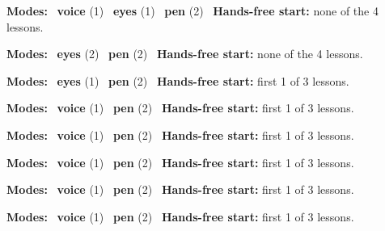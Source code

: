 \expandafter\def\csname hlchaptermodality6\endcsname{%
  {\small\noindent
    \textbf{Modes:} \hlvoicesign{}~\textbf{voice} (1) \quad \hlsightsign{}~\textbf{eyes} (1) \quad \hlpensign{}~\textbf{pen} (2)\quad
    \hlvoicesign{}~\textbf{Hands-free start:} none of the 4 lessons.%
    \par}\medskip
}

\expandafter\def\csname hlchaptermodality7\endcsname{%
  {\small\noindent
    \textbf{Modes:} \hlsightsign{}~\textbf{eyes} (2) \quad \hlpensign{}~\textbf{pen} (2)\quad
    \hlvoicesign{}~\textbf{Hands-free start:} none of the 4 lessons.%
    \par}\medskip
}

\expandafter\def\csname hlchaptermodality8\endcsname{%
  {\small\noindent
    \textbf{Modes:} \hlsightsign{}~\textbf{eyes} (1) \quad \hlpensign{}~\textbf{pen} (2)\quad
    \hlvoicesign{}~\textbf{Hands-free start:} first 1 of 3 lessons.%
    \par}\medskip
}

\expandafter\def\csname hlchaptermodality9\endcsname{%
  {\small\noindent
    \textbf{Modes:} \hlvoicesign{}~\textbf{voice} (1) \quad \hlpensign{}~\textbf{pen} (2)\quad
    \hlvoicesign{}~\textbf{Hands-free start:} first 1 of 3 lessons.%
    \par}\medskip
}

\expandafter\def\csname hlchaptermodality10\endcsname{%
  {\small\noindent
    \textbf{Modes:} \hlvoicesign{}~\textbf{voice} (1) \quad \hlpensign{}~\textbf{pen} (2)\quad
    \hlvoicesign{}~\textbf{Hands-free start:} first 1 of 3 lessons.%
    \par}\medskip
}

\expandafter\def\csname hlchaptermodality11\endcsname{%
  {\small\noindent
    \textbf{Modes:} \hlvoicesign{}~\textbf{voice} (1) \quad \hlpensign{}~\textbf{pen} (2)\quad
    \hlvoicesign{}~\textbf{Hands-free start:} first 1 of 3 lessons.%
    \par}\medskip
}

\expandafter\def\csname hlchaptermodality12\endcsname{%
  {\small\noindent
    \textbf{Modes:} \hlvoicesign{}~\textbf{voice} (1) \quad \hlpensign{}~\textbf{pen} (2)\quad
    \hlvoicesign{}~\textbf{Hands-free start:} first 1 of 3 lessons.%
    \par}\medskip
}

\expandafter\def\csname hlchaptermodality13\endcsname{%
  {\small\noindent
    \textbf{Modes:} \hlvoicesign{}~\textbf{voice} (1) \quad \hlpensign{}~\textbf{pen} (2)\quad
    \hlvoicesign{}~\textbf{Hands-free start:} first 1 of 3 lessons.%
    \par}\medskip
}

